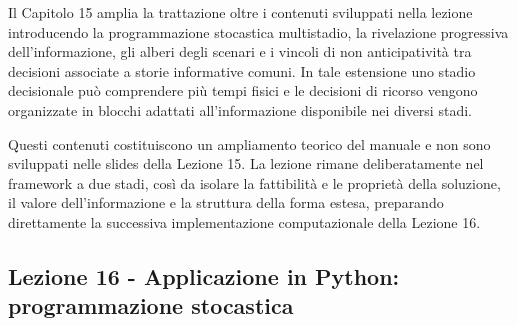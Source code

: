 \documentclass[12pt,a4paper]{article}%
\newcommand{\1}{\mathbf{1}}
\begin{document}
\medskip

Il Capitolo 15 amplia la trattazione oltre i contenuti sviluppati nella
lezione introducendo la programmazione stocastica multistadio, la
rivelazione progressiva dell'informazione, gli alberi degli scenari e i
vincoli di non anticipativit\`{a} tra decisioni associate a storie
informative comuni. In tale estensione uno stadio decisionale pu\`{o}
comprendere pi\`{u} tempi fisici e le decisioni di ricorso vengono
organizzate in blocchi adattati all'informazione disponibile nei diversi
stadi.

Questi contenuti costituiscono un ampliamento teorico del manuale e non sono
sviluppati nelle slides della Lezione 15. La lezione rimane deliberatamente
nel framework a due stadi, cos\`{i} da isolare la fattibilit\`{a} e le
propriet\`{a} della soluzione, il valore dell'informazione e la struttura
della forma estesa, preparando direttamente la successiva implementazione
computazionale della Lezione 16.

\subsection{Lezione 16 - Applicazione in Python: programmazione stocastica}
\end{document}

